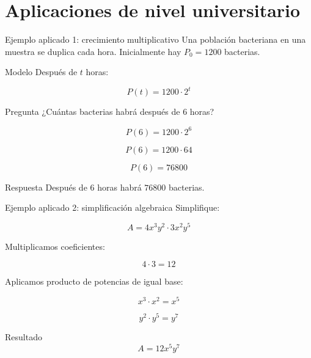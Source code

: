 \documentclass[handout,aspectratio=169]{beamer}
\begin{document}
	\section{Aplicaciones de nivel universitario}
	
	\begin{frame}{Ejemplo aplicado 1: crecimiento multiplicativo}
		Una población bacteriana en una muestra se duplica cada hora.  
		Inicialmente hay \(P_0=1200\) bacterias.
		
		\pause
		
		\begin{block}{Modelo}
			Después de \(t\) horas:
			
			\[
			P(t)=1200\cdot 2^t
			\]
		\end{block}
		
		\pause
		
		\begin{exampleblock}{Pregunta}
			¿Cuántas bacterias habrá después de \(6\) horas?
		\end{exampleblock}
		
		\pause
		
		\[
		P(6)=1200\cdot 2^6
		\]
		
		\[
		P(6)=1200\cdot 64
		\]
		
		\[
		P(6)=76800
		\]
		
		\pause
		
		\begin{block}{Respuesta}
			Después de \(6\) horas habrá \(76800\) bacterias.
		\end{block}
	\end{frame}
	
	\begin{frame}{Ejemplo aplicado 2: simplificación algebraica}
		Simplifique:
		
		\[
		A=4x^3y^2\cdot 3x^2y^5
		\]
		
		\pause
		
		Multiplicamos coeficientes:
		
		\[
		4\cdot 3=12
		\]
		
		\pause
		
		Aplicamos producto de potencias de igual base:
		
		\[
		x^3\cdot x^2=x^5
		\]
		
		\[
		y^2\cdot y^5=y^7
		\]
		
		\pause
		
		\begin{block}{Resultado}
			\[
			A=12x^5y^7
			\]
		\end{block}
	\end{frame}
	
\end{document}
